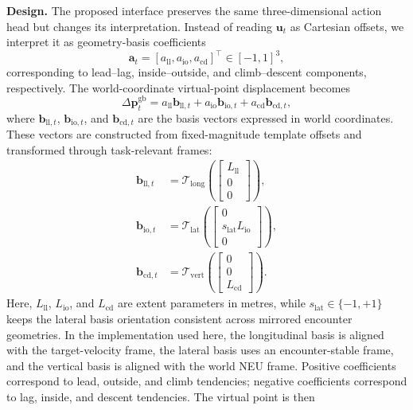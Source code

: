 \documentclass[drones,article,submit,pdftex,moreauthors]{Definitions/mdpi}
\begin{document}
\textbf{Design.} The proposed interface preserves the same three-dimensional action head but changes its interpretation. Instead of reading $\mathbf{u}_t$ as Cartesian offsets, we interpret it as geometry-basis coefficients
\begin{equation}
\mathbf{a}_t = [a_{\mathrm{ll}}, a_{\mathrm{io}}, a_{\mathrm{cd}}]^\top \in [-1,1]^3,
\end{equation}
corresponding to lead--lag, inside--outside, and climb--descent components, respectively. The world-coordinate virtual-point displacement becomes
\begin{equation}
\Delta \mathbf{p}^{\mathrm{gb}}_t
=
a_{\mathrm{ll}} \mathbf{b}_{\mathrm{ll},t}
+ a_{\mathrm{io}} \mathbf{b}_{\mathrm{io},t}
+ a_{\mathrm{cd}} \mathbf{b}_{\mathrm{cd},t},
\label{eq:geometry_basis_offset}
\end{equation}
where $\mathbf{b}_{\mathrm{ll},t}$, $\mathbf{b}_{\mathrm{io},t}$, and $\mathbf{b}_{\mathrm{cd},t}$ are the basis vectors expressed in world coordinates. These vectors are constructed from fixed-magnitude template offsets and transformed through task-relevant frames:
\begin{align}
\mathbf{b}_{\mathrm{ll},t} &= \mathcal{T}_{\mathrm{long}}
\left(
\begin{bmatrix}
L_{\mathrm{ll}} \\
0 \\
0
\end{bmatrix}
\right), \\
\mathbf{b}_{\mathrm{io},t} &= \mathcal{T}_{\mathrm{lat}}
\left(
\begin{bmatrix}
0 \\
s_{\mathrm{lat}} L_{\mathrm{io}} \\
0
\end{bmatrix}
\right), \\
\mathbf{b}_{\mathrm{cd},t} &= \mathcal{T}_{\mathrm{vert}}
\left(
\begin{bmatrix}
0 \\
0 \\
L_{\mathrm{cd}}
\end{bmatrix}
\right).
\end{align}
Here, $L_{\mathrm{ll}}$, $L_{\mathrm{io}}$, and $L_{\mathrm{cd}}$ are extent parameters in metres, while $s_{\mathrm{lat}} \in \{-1, +1\}$ keeps the lateral basis orientation consistent across mirrored encounter geometries. In the implementation used here, the longitudinal basis is aligned with the target-velocity frame, the lateral basis uses an encounter-stable frame, and the vertical basis is aligned with the world NEU frame. Positive coefficients correspond to lead, outside, and climb tendencies; negative coefficients correspond to lag, inside, and descent tendencies. The virtual point is then
\end{document}

